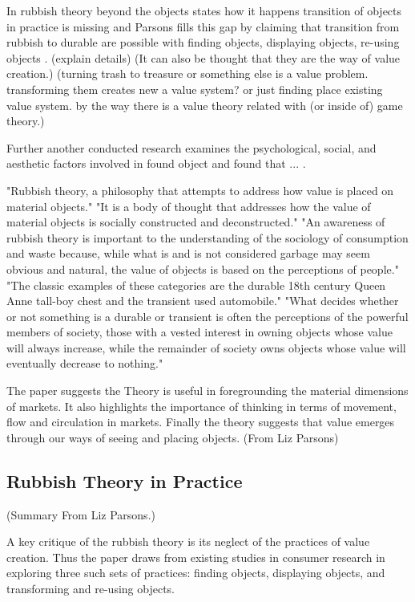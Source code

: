 In rubbish theory beyond the objects states how it happens transition of objects in practice is missing and Parsons fills this gap by claiming that transition from rubbish to durable are possible with finding objects, displaying objects, re-using objects \cite{parsons2008thompsons}. (explain details) (It can also be thought that they are the way of value creation.) (turning trash to treasure or something else is a value problem. transforming them creates new a value system? or just finding place existing value system. by the way there is a value theory related with (or inside of) game theory.)

Further another conducted research examines the psychological, social, and aesthetic factors involved in found object and found that ... \cite{camic2010trashed}.

"Rubbish theory, a philosophy that attempts to address how value is placed on material objects." "It is a body of thought that addresses how the value of material objects is socially constructed and deconstructed." "An awareness of rubbish theory is important to the understanding of the sociology of consumption and waste because, while what is and is not considered garbage may seem obvious and natural, the value of objects is based on the perceptions of people." "The classic examples of these categories are the durable 18th century Queen Anne tall-boy chest and the transient used automobile." "What decides whether or not something is a durable or transient is often the perceptions of the powerful members of society, those with a vested interest in owning objects whose value will always increase, while the remainder of society owns objects whose value will eventually decrease to nothing."

The paper suggests the Theory is useful in foregrounding the material dimensions of markets. It also highlights the importance of thinking in terms of movement, flow and circulation in markets. Finally the theory suggests that value emerges through our ways of seeing and placing objects. (From Liz Parsons)

\subsection{Rubbish Theory in Practice}
(Summary From Liz Parsons.) 

A key critique of the rubbish theory is its neglect of the practices of value creation. Thus the paper draws from existing studies in consumer research in exploring three such sets of practices: finding objects, displaying objects, and transforming and re-using objects.

